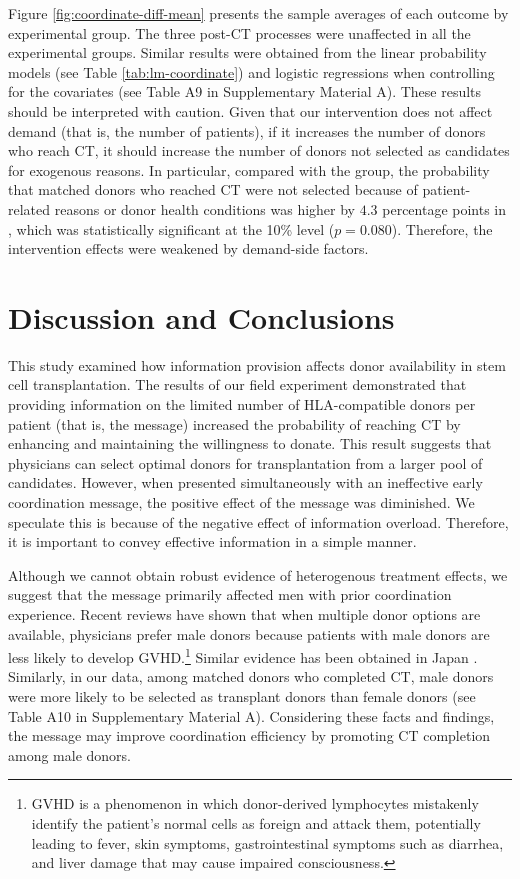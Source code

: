 \documentclass[12pt, a4paper]{article}
\newcommand{\revise}[1]{{\color{red}{#1}}}
\begin{document}
Figure \ref{fig:coordinate-diff-mean} presents the sample averages of each outcome by experimental group. The three post-CT processes were unaffected in all the experimental groups. Similar results were obtained from the linear probability models (see Table \ref{tab:lm-coordinate}) and logistic regressions when controlling for the covariates (see Table A9 in Supplementary Material A). These results should be interpreted with caution. Given that our intervention does not affect demand (that is, the number of patients), if it increases the number of donors who reach CT, it should increase the number of donors not selected as candidates for exogenous reasons. In particular, compared with the \revise{StatusQuo} group, the probability that matched donors who reached CT were not selected because of patient-related reasons or donor health conditions was higher by \(4.3\) percentage points in \revise{the MatchMessage group}, which was statistically significant at the 10\% level (\(p = 0.080\)). Therefore, the intervention effects were weakened by demand-side factors.

\hypertarget{conclusion}{%
\section{Discussion and Conclusions}\label{conclusion}}

This study examined how information provision affects donor availability in stem cell transplantation. The results of our field experiment demonstrated that providing information on the limited number of HLA-compatible donors per patient (that is, the \revise{matching difficulty} message) increased the probability of reaching CT by enhancing and maintaining the willingness to donate. This result suggests that physicians can select optimal donors for transplantation from a larger pool of candidates. However, when presented simultaneously with an ineffective early coordination message, the positive effect of the \revise{matching difficulty} message was diminished. We speculate this is because of the negative effect of information overload. Therefore, it is important to convey effective information in a simple manner.

Although we cannot obtain robust evidence of heterogenous treatment effects, we suggest that the \revise{matching difficulty} message primarily affected men with prior coordination experience. Recent reviews have shown that when multiple donor options are available, physicians prefer male donors \citep{Fingrut2018} because patients with male donors are less likely to develop GVHD.\footnote{GVHD is a phenomenon in which donor-derived lymphocytes mistakenly identify the patient's normal cells as foreign and attack them, potentially leading to fever, skin symptoms, gastrointestinal symptoms such as diarrhea, and liver damage that may cause impaired consciousness.} Similar evidence has been obtained in Japan \citep{Shinohara2017}. Similarly, in our data, among matched donors who completed CT, male donors were more likely to be selected as transplant donors than female donors (see Table A10 in Supplementary Material A). Considering these facts and findings, the \revise{matching difficulty} message may improve coordination efficiency by promoting CT completion among male donors.
\end{document}
